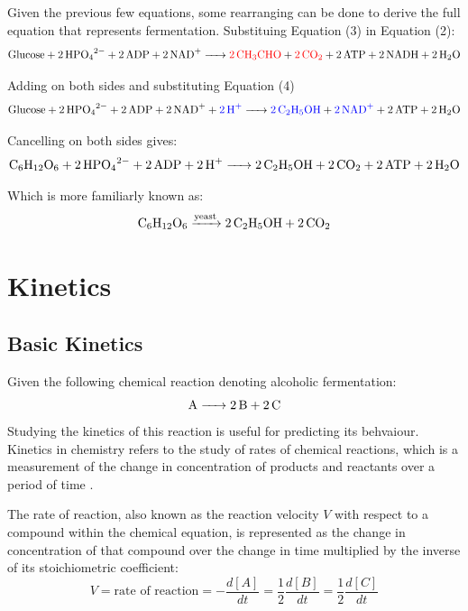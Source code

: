 \documentclass{article}
\begin{document}
Given the previous few equations, some rearranging can be done to derive the full equation that represents fermentation. Substituing Equation (3) in Equation (2):
\begin{equation*}
    \ce{Glucose + 2HPO_{4}^{2-} + 2ADP + 2NAD+ -> \textcolor{red}{\ce{2CH3CHO}} + \textcolor{red}{\ce{2CO2}} + 2ATP + 2NADH + 2H2O}
\end{equation*}

Adding  on both sides and substituting Equation (4)
\begin{equation*}
    \ce{Glucose + 2HPO_{4}^{2-} + 2ADP + 2NAD+ + \textcolor{blue}{\ce{2H+}} -> \textcolor{blue}{\ce{2C2H5OH}} + \textcolor{blue}{\ce{2NAD+}} + 2ATP + 2H2O}
\end{equation*}

Cancelling  on both sides gives:
\begin{equation}
    \ce{C6H12O6 + 2HPO_{4}^{2-} + 2ADP + 2H+ -> 2C2H5OH + 2CO2 + 2ATP + 2H2O}
\end{equation}

Which is more familiarly known as:
\begin{equation}
    \ce{C6H12O6 ->[yeast] 2C2H5OH + 2CO2}
\end{equation}

\section{Kinetics}

\subsection{Basic Kinetics}
Given the following chemical reaction denoting alcoholic fermentation:
\begin{equation}
    \ce{A -> 2B + 2C}
\end{equation}
Studying the kinetics of this reaction is useful for predicting its behvaiour. Kinetics in chemistry refers to the study of rates of chemical reactions, which is a measurement of the change in concentration of products and reactants over a period of time \parencite{ref}.

\medskip

The rate of reaction, also known as the reaction velocity $V$ with respect to a compound within the chemical equation, is represented as the change in concentration of that compound over the change in time multiplied by the inverse of its stoichiometric coefficient:
\begin{equation}
    V = \text{rate of reaction} = -\frac{d[A]}{dt} = \frac{1}{2}\frac{d[B]}{dt} = \frac{1}{2}\frac{d[C]}{dt}
\end{equation}
\end{document}
